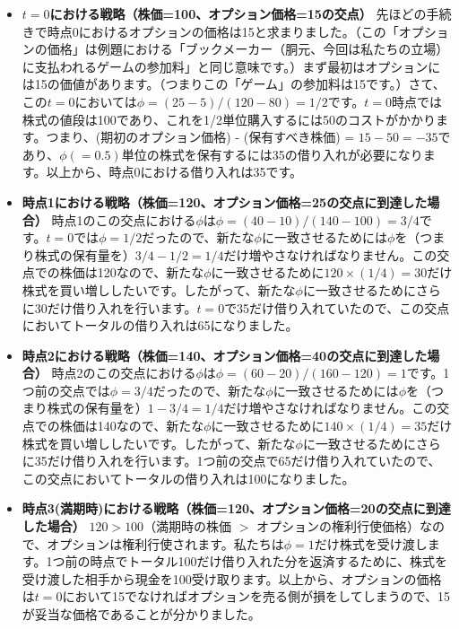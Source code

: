 \documentclass[uplatex,a4j,12pt,dvipdfmx]{jsarticle}
\begin{document}
\begin{itemize}
	\item \textbf{$t=0$における戦略（株価=100、オプション価格=15の交点）}
	      先ほどの手続きで時点0におけるオプションの価格は15と求まりました。（この「オプションの価格」は例題における「ブックメーカー（胴元、今回は私たちの立場）に支払われるゲームの参加料」と同じ意味です。）まず最初はオプションには15の価値があります。（つまりこの「ゲーム」の参加料は15です。）さて、この$t=0$においては$\phi = (25 - 5) / ( 120 - 80 ) = 1/2$です。$t=0$時点では株式の値段は100であり、これを1/2単位購入するには50のコストがかかります。つまり、(期初のオプション価格) - (保有すべき株価) = $15 - 50 = -35$であり、$\phi(= 0.5)$単位の株式を保有するには35の借り入れが必要になります。以上から、時点0における借り入れは35です。

	\item \textbf{時点1における戦略（株価=120、オプション価格=25の交点に到達した場合）}
	      時点1のこの交点における$\phi$は$\phi = ( 40 - 10 ) / ( 140 - 100 ) = 3/4$です。$t=0$では$\phi=1/2$だったので、新たな$\phi$に一致させるためには$\phi$を（つまり株式の保有量を）$3/4 - 1/2 = 1/4$だけ増やさなければなりません。この交点での株価は120なので、新たな$\phi$に一致させるために$120 \times (1/4)=30$だけ株式を買い増ししたいです。したがって、新たな$\phi$に一致させるためにさらに30だけ借り入れを行います。$t=0$で35だけ借り入れていたので、この交点においてトータルの借り入れは65になりました。

	\item \textbf{時点2における戦略（株価=140、オプション価格=40の交点に到達した場合）}
	      時点2のこの交点における$\phi$は$\phi = ( 60 - 20 ) / ( 160 - 120 ) = 1$です。1つ前の交点では$\phi=3/4$だったので、新たな$\phi$に一致させるためには$\phi$を（つまり株式の保有量を）$1 - 3/4 = 1/4$だけ増やさなければなりません。この交点での株価は140なので、新たな$\phi$に一致させるために$140 \times (1/4)=35$だけ株式を買い増ししたいです。したがって、新たな$\phi$に一致させるためにさらに35だけ借り入れを行います。1つ前の交点で65だけ借り入れていたので、この交点においてトータルの借り入れは100になりました。

	\item \textbf{時点3(満期時)における戦略（株価=120、オプション価格=20の交点に到達した場合）}
	      $120 > 100$（満期時の株価 $>$ オプションの権利行使価格）なので、オプションは権利行使されます。私たちは$\phi = 1$だけ株式を受け渡します。1つ前の時点でトータル100だけ借り入れた分を返済するために、株式を受け渡した相手から現金を100受け取ります。以上から、オプションの価格は$t=0$において15でなければオプションを売る側が損をしてしまうので、15が妥当な価格であることが分かりました。
\end{itemize}
\end{document}

